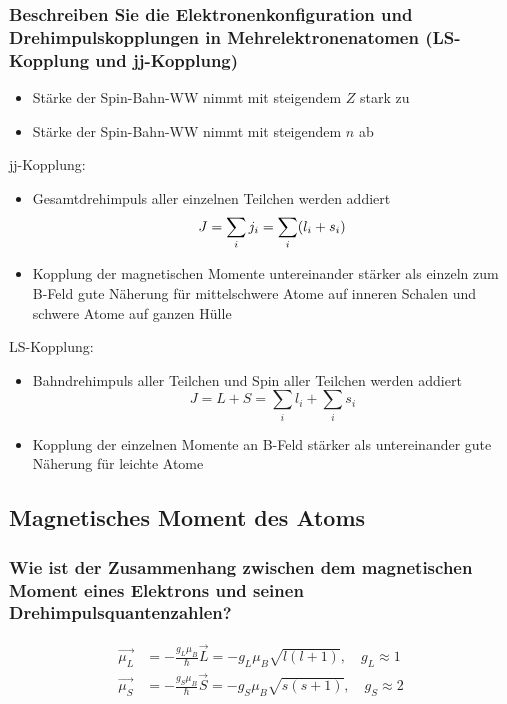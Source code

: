 \subsubsection{Beschreiben Sie die Elektronenkonfiguration und Drehimpulskopplungen in Mehrelektronenatomen (LS-Kopplung und jj-Kopplung)}
\begin{itemize}
    \item Stärke der Spin-Bahn-WW nimmt mit steigendem $Z$ stark zu
    \item Stärke der Spin-Bahn-WW nimmt mit steigendem $n$ ab
\end{itemize}
jj-Kopplung:
\begin{itemize}
    \item Gesamtdrehimpuls aller einzelnen Teilchen werden addiert
    \begin{equation*}
        J=\sum_i j_i=\sum_i(l_i+s_i)\\
    \end{equation*}
    \item Kopplung der magnetischen Momente untereinander stärker als einzeln zum B-Feld
    \to gute Näherung für mittelschwere Atome auf inneren Schalen und schwere Atome auf ganzen Hülle
\end{itemize}

LS-Kopplung: 
\begin{itemize}
    \item Bahndrehimpuls aller Teilchen und Spin aller Teilchen werden addiert
        \begin{equation*}
            J=L+S=\sum_il_i + \sum_i s_i
        \end{equation*}
    \item Kopplung der einzelnen Momente an B-Feld stärker als untereinander
    \to gute Näherung für leichte Atome
\end{itemize}


\subsection{Magnetisches Moment des Atoms}

\subsubsection{Wie ist der Zusammenhang zwischen dem magnetischen Moment eines Elektrons und seinen Drehimpulsquantenzahlen?}
\begin{align*}
    \vec{\mu_L}&=-\frac{g_L\mu_B}{\hbar}\vec{L}=-g_L\mu_B\sqrt{l(l+1)}, \quad g_L\approx 1\\
    \vec{\mu_S}&=-\frac{g_S\mu_B}{\hbar}\vec{S}=-g_S\mu_B\sqrt{s(s+1)}, \quad g_S\approx 2
\end{align*}
